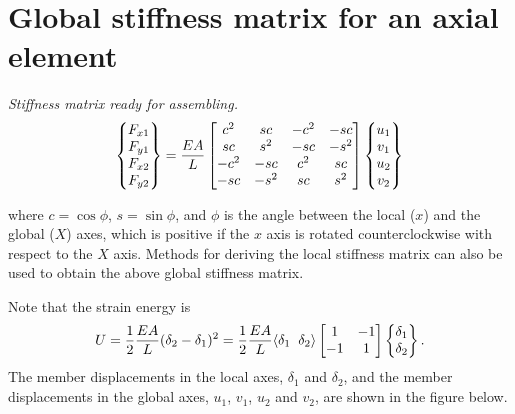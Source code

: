 \section{Global stiffness matrix for an axial element}
\emph{Stiffness matrix ready for assembling.}
\begin{equation}
  \begin{Bmatrix}F_{x1}\\ F_{y1}\\ F_{x2}\\ F_{y2}\end{Bmatrix} = \frac{EA}{L}
  \begin{bmatrix}c^2 & sc & -c^2 & -sc\\ sc & s^2 & -sc & -s^2\\ -c^2 & -sc & c^2 & sc\\ -sc & -s^2 & sc & s^2\end{bmatrix}
  \begin{Bmatrix}u_1\\ v_1\\ u_2\\ v_2\end{Bmatrix}
  \label{eq:truss-global-k}
\end{equation}
\begin{minipage}{0.68\textwidth}
where $c = \cos\phi$, $s = \sin\phi$, and $\phi$ is the angle between the local ($x$) and the global ($X$) axes, which is positive if the $x$ axis is rotated counterclockwise with respect to the $X$ axis. Methods for deriving the local stiffness matrix can also be used to obtain the above global stiffness matrix.
\end{minipage}\hfill
\begin{minipage}{0.28\textwidth}
  \centering
  
\end{minipage}

Note that the strain energy is
\begin{equation}
  U = \frac12\frac{EA}{L}(\delta_2-\delta_1)^2
    = \frac12\frac{EA}{L}\langle\delta_1\;\;\delta_2\rangle\begin{bmatrix}1 & -1\\ -1 & 1\end{bmatrix}\begin{Bmatrix}\delta_1\\ \delta_2\end{Bmatrix}.
\end{equation}
The member displacements in the local axes, $\delta_1$ and $\delta_2$, and the member displacements in the global axes, $u_1$, $v_1$, $u_2$ and $v_2$, are shown in the figure below.
\begin{fig}
  
\end{fig}

